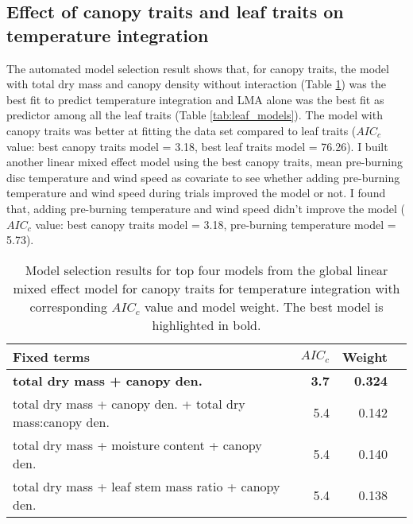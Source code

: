 \documentclass{ttuthes2007}
\begin{document}

\subsection*{\textbf{Effect of canopy traits and leaf traits on temperature integration}}

\noindent The automated model selection result shows that, for canopy traits, the model with total dry mass and canopy density without interaction (Table \ref{tab:canopy_models}) was the best fit to predict temperature integration and \MakeUppercase{lma} alone was the best fit as predictor among all the leaf traits (Table \ref{tab:leaf_models}). The model with canopy traits was better at fitting the data set compared to leaf traits ($AIC_{c}$ value: best canopy traits model = 3.18, best leaf traits model = 76.26). I built another linear mixed effect model using the best canopy traits, mean pre-burning disc temperature and wind speed as  covariate to see whether adding pre-burning temperature and wind speed during trials improved the model or not. I found that, adding pre-burning temperature and wind speed didn't improve the model ($AIC_{c}$ value: best canopy traits model = 3.18, pre-burning temperature model = 5.73).

\begin{table}
  \centering
  \caption{Model selection results for top four models from the global linear
    mixed effect model for canopy traits for temperature integration with
    corresponding $AIC_{c}$ value and model weight. The best model is highlighted in bold.}
  \begin{tabular}{lrrr}
    \toprule
    \textbf{Fixed terms} & \textbf{$AIC_{c}$} & \textbf{Weight}\\
    \midrule
    \textbf{total dry mass + canopy den.}    & \textbf{3.7} &  \textbf{0.324}\\
    total dry mass + canopy den. + total dry mass:canopy den. & 5.4  & 0.142 \\
    total dry mass + moisture content + canopy den.   & 5.4   & 0.140 \\ 
    total dry mass + leaf stem mass ratio + canopy den.  & 5.4 & 0.138  \\
    \bottomrule
  \end{tabular}
  \label{tab:canopy_models}
\end{table}
\end{document}
